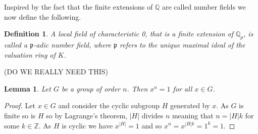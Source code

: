 \documentclass{article}
\newtheorem{definition}{Definition}[section]
\newtheorem{lemma}{Lemma}[section]
\newcommand{\mfrak}[1]{\mathfrak{#1}}
\newcommand{\mbb}[1]{\mathbb{#1}}
\numberwithin{equation}{section}
\begin{document}
Inspired by the fact that the finite extensions of $\mbb Q$ are called number fields we now define the following.

\begin{definition}
    A local field of characteristic 0, that is a finite extension of $\mbb Q_p$, is called a $\mfrak p$-adic number field, where $\mfrak p$ refers to the unique maximal ideal of the valuation ring of $K$.
\end{definition}



(DO WE REALLY NEED THIS)
\begin{lemma}\label{lem: x^|G| = 1}
    Let $G$ be a group of order $n$. Then $x^n = 1$ for all $x \in G$.
\end{lemma}
\begin{proof}
    Let $x \in G$ and consider the cyclic subgroup $H$ generated by $x$. As $G$ is finite so is $H$ so by Lagrange's theorem, $|H|$ divides $n$ meaning that $n = |H|k$ for some $k \in \mbb Z$. As $H$ is cyclic we have $x^{|H|} = 1$ and so $x^n = x^{|H|k} = 1^k = 1$.
\end{proof}
\end{document}
